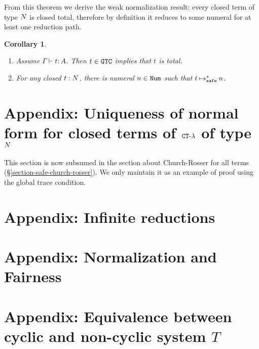 \documentclass{article}
\newtheorem{corollary}[theorem]{Corollary}
\begin{document}
From this theorem we derive the weak normalization result: 
every closed term of type ${N}$ is closed total, therefore by definition it reduces to some numeral for at least
one reduction path. 

\begin{corollary}\label{cor:WN_typeN}
  \begin {enumerate}
  \item
   Assume  $\Gamma\vdash t:A$. Then $t \in {\tt GTC}$ implies that $t$ is total.
  \item
    For any closed $t:{N}$, there is numeral $n\in{\tt Num}$ such that $t\mathbin{\mathbin{\mapsto}_{\hbox{\scriptsize \tt safe}}^*} n$. 
  \end{enumerate}
\end{corollary}



\section{Appendix: Uniqueness of normal form for closed terms of ${ {\tt CT} \mbox{-} \lambda}$ of type ${N}$}
\label{section-uniqueness-normal-form}
This section is now subsumed in the section about Church-Rosser for all terms 
(\S \ref{section-safe-church-rosser}). 
We only maintain it as an example of proof using the global trace condition.
\\




\section{Appendix: Infinite reductions}
\label{section-infinite-reductions}




\section{Appendix: Normalization and Fairness}
\label{section-normalization-fairness}



\section{Appendix: Equivalence between cyclic and non-cyclic system $T$} 
\label{section-equivalence-cyclic-non-cyclic-T}

\end{document}
